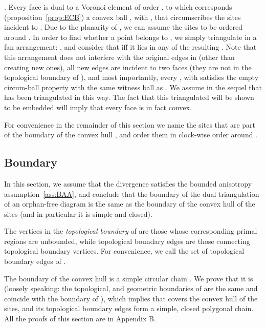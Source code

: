\documentclass[11pt]{article}
\begin{document}
\vspace*{0.08in}. 
Every face  is dual to a Voronoi element  of order , 
	to which corresponds (proposition~\ref{prop:ECB}) a convex ball , with , 
	that circumscribes the sites  incident to . 
Due to the planarity of , we can assume the sites  to be ordered around . 
In order to find whether a point  belongs to , 
	we simply triangulate  in a fan arrangement: 
		, 
	and consider that  iff it lies in any of the resulting . 
Note that this arrangement does not interfere with the original edges in  (other than creating new ones), 
	all new edges are incident to two faces (they are not in the topological boundary of ), 
	and most importantly, 
every , with  satisfies the empty circum-ball property with the same {witness} ball  
	as . 
We assume in the sequel that  has been triangulated in this way. 
The fact that this triangulated  will be shown to be embedded will imply that every face  is in fact convex. 



For convenience in the remainder of this section 
we name  the sites that are part of the boundary of
the convex hull , and order them in clock-wise order around . 



\subsection{Boundary}\label{sec:boundary}

In this section, we assume that the divergence  satisfies the bounded anisotropy assumption~\ref{ass:BAA},
 and conclude that the boundary of the dual triangulation of an orphan-free diagram is the same as the boundary of the convex hull of the sites (and in particular it is simple and closed). 

The vertices in the \emph{topological boundary} of  are those 
	whose corresponding primal regions are unbounded, 
while topological boundary edges are those connecting topological boundary vertices. 
For convenience, we call  the set of topological boundary edges of . 

The boundary  of the convex hull is a simple circular chain 
. We prove that it is  
(loosely speaking: the topological, and geometric boundaries of  are the same and coincide with the boundary of ), 
which implies that  covers
the convex hull of the sites, and its topological boundary edges form 
a simple, closed polygonal chain. All the proofs of this section are in Appendix B. 
\end{document}
